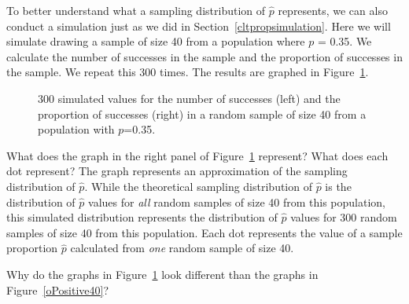 To better understand what a sampling distribution of $\hat{p}$ represents, we can also conduct a simulation just as we did in Section~\ref{cltpropsimulation}. Here we will simulate drawing a sample of size 40 from a population where $p$ = 0.35.  We calculate the number of successes in the sample and the proportion of successes in the sample.  We repeat this 300 times.  The results are graphed in Figure~\ref{oPositive40simulation}.

\begin{figure}[ht]
\centering
{}
\qquad \qquad \qquad \quad
{}

\caption{300 simulated values for the number of successes (left) and the proportion of successes (right) in a random sample of size 40 from a population with $p$=0.35.}
\label{oPositive40simulation}
\end{figure}

\begin{examplewrap}
\begin{nexample}
{What does the graph in the right panel of Figure~\ref{oPositive40simulation} represent?  What does each dot represent?}
The graph represents an approximation of the sampling distribution of $\hat{p}$.  While the theoretical sampling distribution of $\hat{p}$ is the distribution of $\hat{p}$ values for \emph{all} random samples of size 40 from this population, this simulated distribution represents the distribution of $\hat{p}$ values for 300 random samples of size 40 from this population.  Each dot represents the value of a sample proportion $\hat{p}$ calculated from \emph{one} random sample of size 40.
\end{nexample}
\end{examplewrap}

\begin{exercisewrap}
\begin{nexercise}
Why do the graphs in Figure~\ref{oPositive40simulation} look different than the graphs in Figure~\ref{oPositive40}?\footnotemark
\end{nexercise}
\end{exercisewrap}


